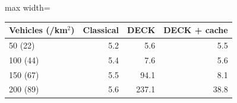 \begin{adjustbox}{max width=\linewidth}
\begin{tabular}{lrrr}
\toprule
Vehicles (/km$^2$) & Classical & DECK & DECK + cache \\
\midrule
50 (22) & 5.2 & 5.6 & 5.5 \\
100 (44) & 5.4 & 7.6 & 5.6 \\
150 (67) & 5.5 & 94.1 & 8.1 \\
200 (89) & 5.6 & 237.1 & 38.8 \\
\bottomrule
\end{tabular}
\end{adjustbox}
\par{}
